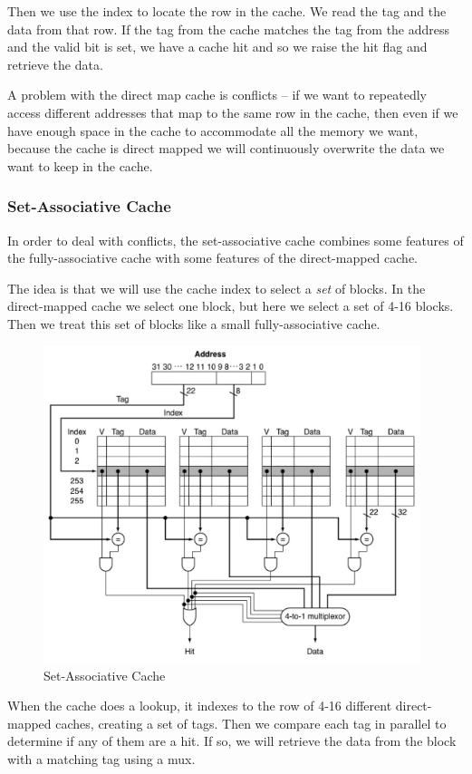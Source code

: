 \documentclass{article}
\begin{document}
Then we use the index to locate the row in the cache. We read the tag and the data from that row. If the tag from the cache matches the tag from the address and the valid bit is set, we have a cache hit and so we raise the hit flag and retrieve the data.

A problem with the direct map cache is conflicts -- if we want to repeatedly access different addresses that map to the same row in the cache, then even if we have enough space in the cache to accommodate all the memory we want, because the cache is direct mapped we will continuously overwrite the data we want to keep in the cache.

\subsubsection{Set-Associative Cache}

In order to deal with conflicts, the set-associative cache combines some features of the fully-associative cache with some features of the direct-mapped cache.

The idea is that we will use the cache index to select a \textit{set} of blocks. In the direct-mapped cache we select one block, but here we select a set of 4-16 blocks. Then we treat this set of blocks like a small fully-associative cache. 

\begin{figure}[ht!]
\centering
\includegraphics[width=110mm]{img/sac.png}
\caption{Set-Associative Cache}
\end{figure}

When the cache does a lookup, it indexes to the row of 4-16 different direct-mapped caches, creating a set of tags. Then we compare each tag in parallel to determine if any of them are a hit. If so, we will retrieve the data from the block with a matching tag using a mux. 
\end{document}
